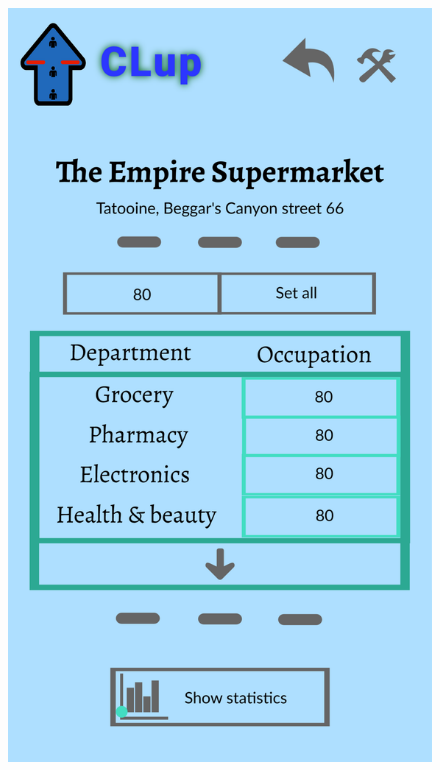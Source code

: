 \begin{itemize}
\begin{figure}[!htb]
		\includegraphics[scale=0.1]{Images/ModifyOccupation.png}
	\end{figure}
	\newpage
\end{itemize}
